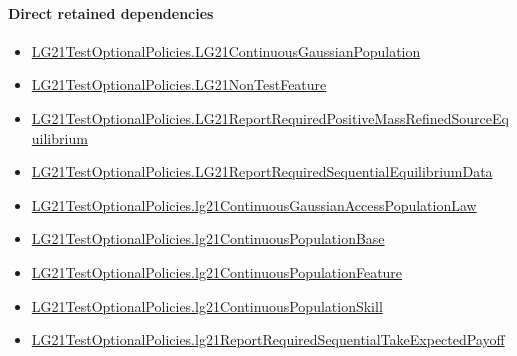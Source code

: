 \documentclass[10pt]{article}
\begin{document}
\paragraph{Direct retained dependencies}
\begin{itemize}\raggedright
\item \hyperlink{paper-prerequisite-f5e1c886d250142b}{LG21\allowbreak{}Test\allowbreak{}Optional\allowbreak{}Policies.\allowbreak{}LG21\allowbreak{}Continuous\allowbreak{}Gaussian\allowbreak{}Population}
\item \hyperlink{governing-declaration-81cb73bf3869c56d}{LG21\allowbreak{}Test\allowbreak{}Optional\allowbreak{}Policies.\allowbreak{}LG21\allowbreak{}Non\allowbreak{}Test\allowbreak{}Feature}
\item \hyperlink{governing-declaration-f947776cd95aec9b}{LG21\allowbreak{}Test\allowbreak{}Optional\allowbreak{}Policies.\allowbreak{}LG21\allowbreak{}Report\allowbreak{}Required\allowbreak{}Positive\allowbreak{}Mass\allowbreak{}Refined\allowbreak{}Source\allowbreak{}Equilibrium}
\item \hyperlink{governing-declaration-b4426f8407925151}{LG21\allowbreak{}Test\allowbreak{}Optional\allowbreak{}Policies.\allowbreak{}LG21\allowbreak{}Report\allowbreak{}Required\allowbreak{}Sequential\allowbreak{}Equilibrium\allowbreak{}Data}
\item \hyperlink{governing-declaration-fa49b6c4b938413f}{LG21\allowbreak{}Test\allowbreak{}Optional\allowbreak{}Policies.\allowbreak{}lg21\allowbreak{}Continuous\allowbreak{}Gaussian\allowbreak{}Access\allowbreak{}Population\allowbreak{}Law}
\item \hyperlink{governing-declaration-3b5146b167dee236}{LG21\allowbreak{}Test\allowbreak{}Optional\allowbreak{}Policies.\allowbreak{}lg21\allowbreak{}Continuous\allowbreak{}Population\allowbreak{}Base}
\item \hyperlink{governing-declaration-f07391974a356bb7}{LG21\allowbreak{}Test\allowbreak{}Optional\allowbreak{}Policies.\allowbreak{}lg21\allowbreak{}Continuous\allowbreak{}Population\allowbreak{}Feature}
\item \hyperlink{governing-declaration-339ce55dcb78dfb9}{LG21\allowbreak{}Test\allowbreak{}Optional\allowbreak{}Policies.\allowbreak{}lg21\allowbreak{}Continuous\allowbreak{}Population\allowbreak{}Skill}
\item \hyperlink{governing-declaration-aa7a3ab24a822e11}{LG21\allowbreak{}Test\allowbreak{}Optional\allowbreak{}Policies.\allowbreak{}lg21\allowbreak{}Report\allowbreak{}Required\allowbreak{}Sequential\allowbreak{}Take\allowbreak{}Expected\allowbreak{}Payoff}
\end{itemize}
\hypertarget{governing-declaration-26b5bf4a8106606e}{}
\end{document}
